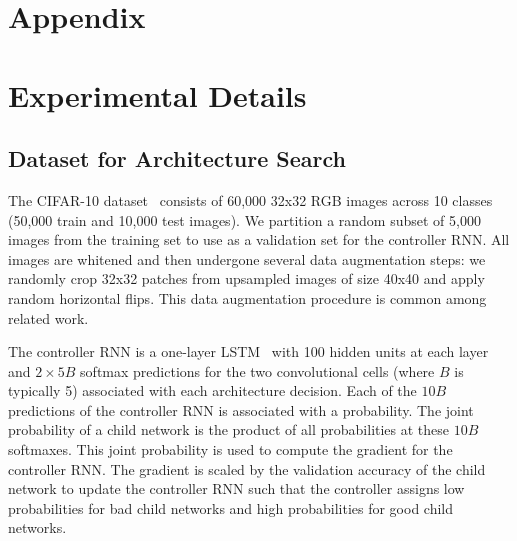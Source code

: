 \documentclass[10pt,twocolumn,letterpaper]{article}
\begin{document}
{\small


}

\clearpage
\newpage\appendix\section*{Appendix}\section{Experimental Details}\label{section:appendix-details}\subsection{Dataset for Architecture Search}
The CIFAR-10 dataset~\cite{krizhevsky2009learning} consists of 60,000 32x32 RGB images across 10 classes (50,000 train and 10,000 test images).
We partition a random subset of 5,000 images from the training set to use as a validation set for the controller RNN. All images are whitened and then undergone several data augmentation steps: we randomly crop 32x32 patches from upsampled images of size 40x40 and apply random horizontal flips. This data augmentation procedure is common among related work.

The controller RNN is a one-layer LSTM~\cite{lstm} with 100 hidden units at each layer and $2 \times 5B$ softmax predictions for the two convolutional cells (where $B$ is typically 5) associated with each architecture decision. Each of the $10B$ predictions of the controller RNN is associated with a probability. The joint probability of a child network is the product of all probabilities at these $10B$ softmaxes. This joint probability is used to compute the gradient for the controller RNN. The gradient is scaled by the validation accuracy of the child network to update the controller RNN such that the controller assigns low probabilities for bad child networks and high probabilities for good child networks. 
\end{document}
